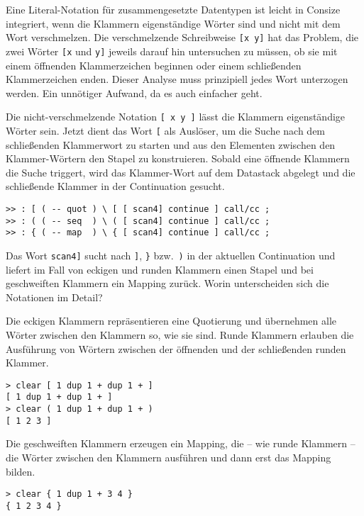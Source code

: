 Eine Literal-Notation für zusammengesetzte Datentypen ist leicht in Consize integriert, wenn die Klammern eigenständige Wörter sind und nicht mit dem Wort verschmelzen. Die verschmelzende Schreibweise \verb|[x y]| hat das Problem, die zwei Wörter \verb|[x| und \verb|y]| jeweils darauf hin untersuchen zu müssen, ob sie mit einem öffnenden Klammerzeichen beginnen oder einem schließenden Klammerzeichen enden. Dieser Analyse muss prinzipiell jedes Wort unterzogen werden. Ein unnötiger Aufwand, da es auch einfacher geht.

Die nicht-verschmelzende Notation \verb|[ x y ]| lässt die Klammern eigen\-stän\-di\-ge Wörter sein. Jetzt dient das Wort \verb|[| als Auslöser, um die Suche nach dem schließenden Klammerwort zu starten und aus den Elementen zwischen den Klammer-Wörtern den Stapel zu konstruieren. Sobald eine öffnende Klammern die Suche triggert, wird das Klammer-Wort auf dem Datastack abgelegt und die schließende Klammer in der Continuation gesucht. 

\begin{verbatim}
>> : [ ( -- quot ) \ [ [ scan4] continue ] call/cc ;
>> : ( ( -- seq  ) \ ( [ scan4] continue ] call/cc ;
>> : { ( -- map  ) \ { [ scan4] continue ] call/cc ;
\end{verbatim}

Das Wort \verb|scan4]| sucht nach \verb|]|, \verb|}| bzw.\ \verb|)| in der aktuellen Continuation und liefert im Fall von eckigen und runden Klammern einen Stapel und bei geschweiften Klammern ein Mapping zurück. Worin unterscheiden sich die Notationen im Detail?

Die eckigen Klammern repräsentieren eine Quotierung und übernehmen alle Wörter zwischen den Klammern so, wie sie sind. Runde Klammern erlauben die Ausführung von Wörtern zwischen der öffnenden und der schließenden runden Klammer.

\begin{verbatim}
> clear [ 1 dup 1 + dup 1 + ]
[ 1 dup 1 + dup 1 + ]
> clear ( 1 dup 1 + dup 1 + )
[ 1 2 3 ]
\end{verbatim}

Die geschweiften Klammern erzeugen ein Mapping, die -- wie runde Klammern -- die Wörter zwischen den Klammern ausführen und dann erst das Mapping bilden.

\begin{verbatim}
> clear { 1 dup 1 + 3 4 }
{ 1 2 3 4 }
\end{verbatim}

